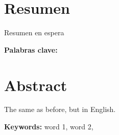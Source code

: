 \chapter*{Resumen}
\thispagestyle{empty}

Resumen en espera

\bigskip

\textbf{Palabras clave:} \thesisKeywords

\clearpage
\chapter*{Abstract}
\thispagestyle{empty}

The same as before, but in English.

\bigskip

\textbf{Keywords:} word 1, word 2, 

\cleardoublepage

